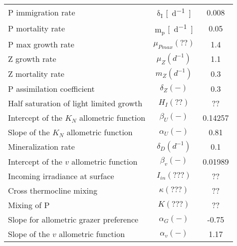 \begin{table}[H]
\begin{tabular}{lcc}
P immigration rate                          & $\mathrm{\delta_I}$ \si{[d^{-1}]}               & 0.008     \\
P mortality rate                            & $\mathrm{m_p}$ \si{[d^{-1}]}                 & 0.05      \\
P max growth rate                           & $\mu_{Pmax} (??)$                 & 1.4       \\
Z growth rate                               & $\mu_Z (d^{-1})$                  & 1.1       \\
Z mortality rate                            & $m_Z (d^{-1})$                    & 0.3       \\
P assimilation coefficient                  & $\delta_Z (-)$                    & 0.3       \\
Half saturation of light limited growth     & $H_I (??)$                        & ??        \\
Intercept of the $K_N$ allometric function  & $\beta_U (-)$                     & 0.14257   \\
Slope of the $K_N$ allometric function      & $\alpha_U (-)$                    & 0.81      \\
Mineralization rate                         & $\delta_D (d^{-1})$               & 0.1       \\
Intercept of the $v$ allometric function    & $\beta_v (-)$                     & 0.01989   \\
Incoming irradiance at surface              & $I_{in} (???)$                    & ??        \\
Cross thermocline mixing                    & $\kappa (???)$                    & ??        \\
Mixing of P                                 & $K (???)$                         & ??        \\
Slope for allometric grazer preference      & $\alpha_G (-)$                    & -0.75     \\
Slope of the $v$ allometric function        & $\alpha_v (-)$                    & 1.17      \\
\hline
\end{tabular}
\end{table}

